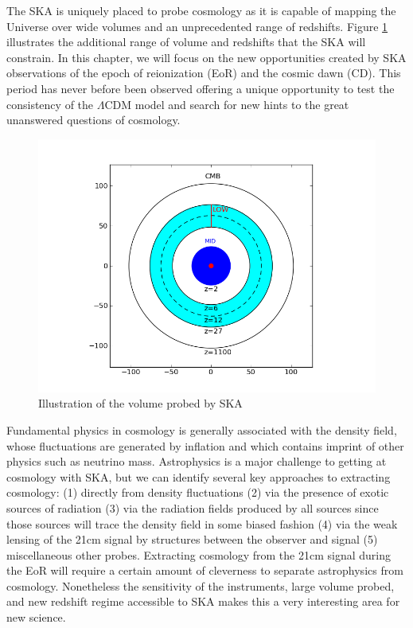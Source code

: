 \documentclass{PoS}
\begin{document}
The SKA is uniquely placed to probe cosmology as it is capable of mapping the Universe over wide volumes and an unprecedented range of redshifts. Figure \ref{fig:volume} illustrates the additional range of volume and redshifts that the SKA will constrain. In this chapter, we will focus on the new opportunities created by SKA observations of the epoch of reionization (EoR) and the cosmic dawn (CD). This period has never before been observed offering a unique opportunity to test the consistency of the $\Lambda$CDM model and search for new hints to the great unanswered questions of cosmology.

\begin{figure}[htbp]
\begin{center}
\includegraphics[scale=0.6]{figures/volumecirc.png}
\caption{Illustration of the volume probed by SKA}
\label{fig:volume}
\end{center}
\end{figure}

Fundamental physics in cosmology is generally associated with the density field, whose fluctuations are generated by inflation and which contains imprint of other physics such as neutrino mass. Astrophysics is a major challenge to getting at cosmology with SKA, but we can identify several key approaches to extracting cosmology: (1) directly from density fluctuations (2) via the presence of exotic sources of radiation (3) via the radiation fields produced by all sources since those sources will trace the density field in some biased fashion (4) via the weak lensing of the 21cm signal by structures between the observer and signal (5) miscellaneous other probes. Extracting cosmology from the 21cm signal during the EoR will require a certain amount of cleverness to separate astrophysics from cosmology. Nonetheless the sensitivity of the instruments, large volume probed, and new redshift regime accessible to SKA makes this a very interesting area for new science. 
\end{document}
